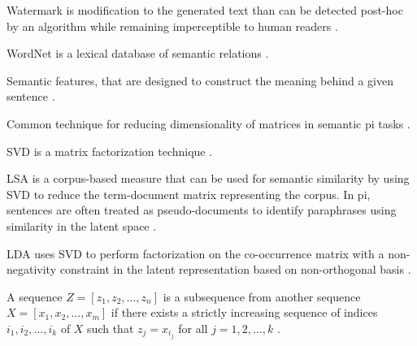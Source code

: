 \begin{definition}
    [Watermark]
    Watermark is modification to the generated text than can be detected post-hoc by an algorithm while remaining imperceptible to human readers \cite{krishna_paraphrasing_2023}.
\end{definition}

\begin{definition}
    [WordNet]
    WordNet is a lexical database of semantic relations \cite{zhou_paraphrase_2025}.
\end{definition}

\begin{definition}
    Semantic features, that are designed to construct the meaning behind a given sentence \cite{zhou_paraphrase_2025}.
\end{definition}

\begin{definition}
    Common technique for reducing dimensionality of matrices in semantic \ac{pi} tasks \cite{zhou_paraphrase_2025}.
\end{definition}

\begin{definition}
    SVD is a matrix factorization technique \cite{zhou_paraphrase_2025}.
\end{definition}

\begin{definition}
    LSA is a corpus-based measure that can be used for semantic similarity by using SVD to reduce the term-document matrix representing the corpus.
    In \ac{pi}, sentences are often treated as pseudo-documents to identify paraphrases using similarity in the latent space \cite{zhou_paraphrase_2025}.
\end{definition}

\begin{definition}
    LDA uses SVD to perform factorization on the co-occurrence matrix with a non-negativity constraint in the latent representation based on non-orthogonal basis \cite{zhou_paraphrase_2025}.
\end{definition}

\begin{definition}
    [Subsequence]
    A sequence $Z=[z_1, z_2, ..., z_n]$ is a subsequence from another sequence $X=[x_1, x_2, ..., x_m]$ if there exists a strictly increasing sequence of indices $i_1, i_2, ..., i_k$ of $X$ such that $z_j = x_{i_j}$ for all $j=1, 2, ..., k$ \cite{lin_rouge_2004}.
\end{definition}

